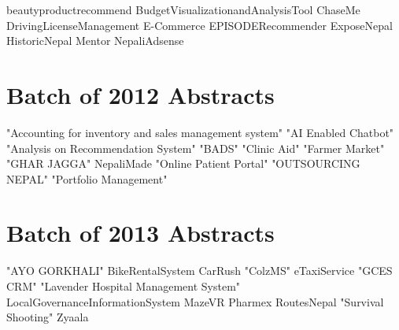 \documentclass[12pt]{book}
\newcommand{\chapterformatDefault}{
	\titleformat{\chapter}[display]
	{\normalfont\huge\bfseries}{\chaptertitlename\ \thechapter}{20pt}{\Huge}
}
\begin{document}

%
{beautyproductrecommend}
{BudgetVisualizationandAnalysisTool}
{ChaseMe}
{DrivingLicenseManagement}
{E-Commerce}
{EPISODERecommender}
{ExposeNepal}
{HistoricNepal}
{Mentor}
{NepaliAdsense}


\chapter[Batch of 2012]{Batch of 2012 Abstracts}
{"Accounting for inventory and sales management system"}
{"AI Enabled Chatbot"}
{"Analysis on Recommendation System"}
{"BADS"}
{"Clinic Aid"}
{"Farmer Market"}
{"GHAR JAGGA"}
{NepaliMade}
{"Online Patient Portal"}
{"OUTSOURCING NEPAL"}
{"Portfolio Management"}



\chapter[Batch of 2013]{Batch of 2013 Abstracts}
{"AYO GORKHALI"}
{BikeRentalSystem}
{CarRush}
{"ColzMS"}
{eTaxiService}
{"GCES CRM"}
{"Lavender Hospital Management System"}
{LocalGovernanceInformationSystem}
{MazeVR}
{Pharmex}
{RoutesNepal}
{"Survival Shooting"}
{Zyaala}



\backmatter
\chapterformatDefault
\pagestyle{plain}
\renewcommand{\indexname}{Author Index}
\printindex
\end{document}
